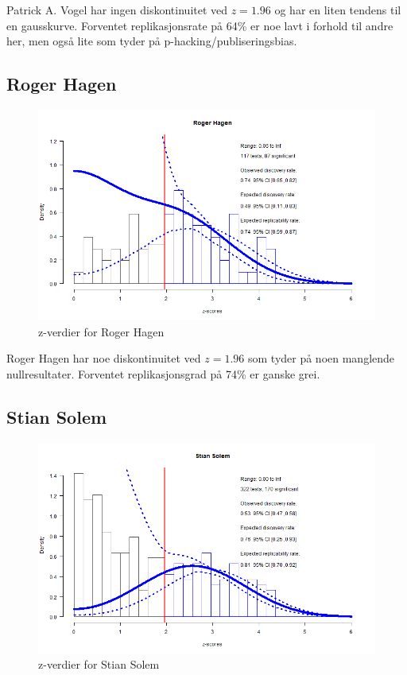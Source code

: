 \documentclass[doc,norsk]{apa7}
\begin{document}
Patrick A. Vogel har ingen diskontinuitet ved $z=1.96$ og har en liten tendens til en gausskurve. Forventet replikasjonsrate på 64\% er noe lavt i forhold til andre her, men også lite som tyder på p-hacking/publiseringsbias.

\subsection{Roger Hagen}
\begin{figure}[h!]
    \centering
    \includegraphics[width=\textwidth]{images/Roger Hagen.png}
    \caption{z-verdier for Roger Hagen}
\end{figure}

Roger Hagen har noe diskontinuitet ved $z=1.96$ som tyder på noen manglende nullresultater. Forventet replikasjonsgrad på 74\% er ganske grei.

\subsection{Stian Solem}
\begin{figure}[h!]
    \centering
    \includegraphics[width=\textwidth]{images/Stian Solem.png}
    \caption{z-verdier for Stian Solem}
\end{figure}
\end{document}
